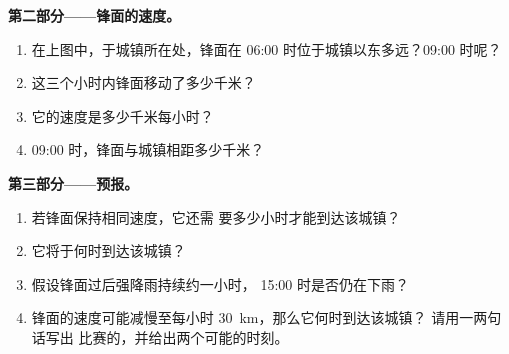 \begin{problem}
\noindent\textbf{第二部分——锋面的速度。}\par\nopagebreak
\begin{enumerate}[resume, beginpenalty=10000]
  \item 在上图中，于城镇所在处，锋面在
        06:00 时位于城镇以东多远？09:00 时呢？
  \item 这三个小时内锋面移动了多少千米？
  \item 它的速度是多少千米每小时？
  \item 09:00 时，锋面与城镇相距多少千米？
\end{enumerate}

\noindent\textbf{第三部分——预报。}\par\nopagebreak
\begin{enumerate}[resume, beginpenalty=10000]
  \item 若锋面保持相同速度，它还需
        要多少小时才能到达该城镇？
  \item 它将于何时到达该城镇？
  \item 假设锋面过后强降雨持续约一小时，
        15:00 时是否仍在下雨？
  \item 锋面的速度可能减慢至每小时 \qty{30}{km}，那么它何时到达该城镇？
        请用一两句话写出
        比赛的，并给出两个可能的时刻。
\end{enumerate}
\end{problem}

